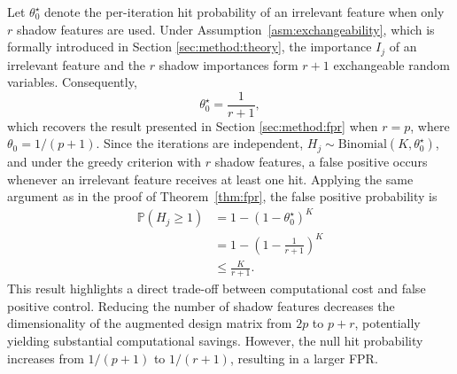 \documentclass[runningheads]{llncs}
\begin{document}
Let \(\theta_0^\star\) denote the per-iteration hit probability of an irrelevant feature when only \(r\) shadow features are used. Under Assumption~\ref{asm:exchangeability}, which is formally introduced in Section \ref{sec:method:theory}, the importance \(I_j\) of an irrelevant feature and the \(r\) shadow importances form \(r+1\) exchangeable random variables. Consequently,
\[
\theta_0^\star = \frac{1}{r+1},
\]
which recovers the result presented in Section \ref{sec:method:fpr} when \(r=p\), where \(\theta_0 = 1/(p+1)\). Since the iterations are independent, \(H_j \sim \mathrm{Binomial}(K,\theta_0^\star)\), and under the greedy criterion with \(r\) shadow features, a false positive occurs whenever an irrelevant feature receives at least one hit. Applying the same argument as in the proof of Theorem~\ref{thm:fpr}, the false positive probability is
\begin{align}
\label{eqn:fpr_upper_bound}
\mathbb{P}(H_j \geq 1)
&=
1-(1-\theta_0^\star)^K \nonumber\\
&=
1-\left(1-\frac{1}{r+1}\right)^K \nonumber\\
&\leq \frac{K}{r+1}. 
\end{align}
This result highlights a direct trade-off between computational cost and false positive control. Reducing the number of shadow features decreases the dimensionality of the augmented design matrix from \(2p\) to \(p+r\), potentially yielding substantial computational savings. However, the null hit probability increases from \(1/(p+1)\) to \(1/(r+1)\), resulting in a larger FPR.
\end{document}
